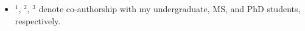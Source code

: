 \documentclass[11pt]{article}
\newcommand{\mypubcc}[1]{\item~\label{#1} \fullcite{\detokenize{#1}c}}
\begin{document}


\begin{itemize}[label={},before=\small]
    \item \(^1\), \(^2\), \(^3\) denote co-authorship with my undergraduate, MS, and PhD students, respectively.
\end{itemize}



\myconfs{}




    
    

\end{document}

